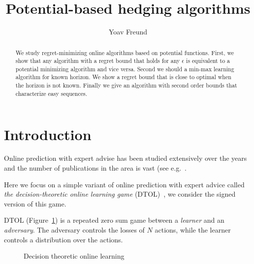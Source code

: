 \documentclass{article}[12pt]
\title{Potential-based hedging algorithms}
\author{Yoav Freund}
\begin{document}
\maketitle
\begin{abstract}
  We study regret-minimizing online algorithms based on potential
functions. First, we show that any algorithm with a regret bound that
holds for any $\epsilon$ is equivalent to a potential minimizing
algorithm and vice versa. Second we should a min-max learning
algorithm for known horizon. We show a regret bound that is close to
optimal when the horizon is not known. Finally we give an algorithm
with second order bounds that characterize easy sequences.
\end{abstract}

\section{Introduction}
Online prediction with expert advise has been studied extensively over
the years and the number of publications in the area is vast (see
e.g.~\cite{vovk1990aggregating, feder1992universal,
  littlestone1994weighted, cesa1997use, cesa2006prediction}.

Here we focus on a simple variant of online prediction with expert
advice called {\em the decision-theoretic online learning game}
(DTOL)~\cite{freund1997decision}, we  consider the 
  signed version of this game.

DTOL (Figure~\ref{fig:DTOL}) is a repeated zero sum game between a {\em learner} and an {\em
  adversary}. The adversary controls the losses of $N$ actions, while
the learner controls a distribution over the actions.

\begin{figure}[ht!]
\caption{Decision theoretic online learning \label{fig:DTOL}}
\end{figure}
\end{document}
